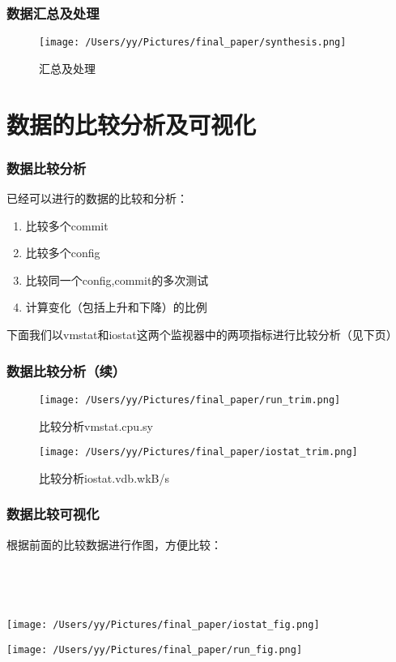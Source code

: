 \documentclass[xcolor=dvipsnames,11pt]{beamer}
\begin{document}
\begin{frame}
\frametitle{数据汇总及处理}


\begin{figure}[htp]
\centering
\texttt{[image: /Users/yy/Pictures/final\_paper/synthesis.png]}
\caption{汇总及处理}
\label{}
\end{figure}
\end{frame}

\section{数据的比较分析及可视化}

\begin{frame}
\frametitle{数据比较分析}
已经可以进行的数据的比较和分析：
\begin{enumerate}
\item 比较多个commit
\item 比较多个config
\item 比较同一个config,commit的多次测试
\item 计算变化（包括上升和下降）的比例
\end{enumerate}

下面我们以vmstat和iostat这两个监视器中的两项指标进行比较分析（见下页）

\end{frame}

\begin{frame}
\frametitle{数据比较分析（续）}
\begin{figure}[htp]
\centering
\texttt{[image: /Users/yy/Pictures/final\_paper/run\_trim.png]}
\caption{比较分析vmstat.cpu.sy}
\label{}
\end{figure}
\begin{figure}[htp]
\centering
\texttt{[image: /Users/yy/Pictures/final\_paper/iostat\_trim.png]}
\caption{比较分析iostat.vdb.wkB/s}
\label{}
\end{figure}

\end{frame}

\begin{frame}
\frametitle{数据比较可视化}
根据前面的比较数据进行作图，方便比较：

\ 

\ 
\begin{minipage}[b]{0.48\linewidth}
\texttt{[image: /Users/yy/Pictures/final\_paper/iostat\_fig.png]}
\end{minipage}
\begin{minipage}[b]{0.48\linewidth}
\texttt{[image: /Users/yy/Pictures/final\_paper/run\_fig.png]}
\end{minipage}

\end{frame}
\end{document}
